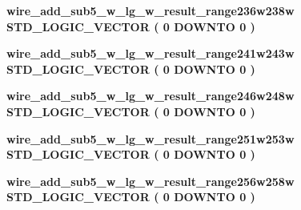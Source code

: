 \begin{DoxyCompactItemize}
\item 
{\bf wire\+\_\+add\+\_\+sub5\+\_\+w\+\_\+lg\+\_\+w\+\_\+result\+\_\+range236w238w} {\bfseries \textcolor{comment}{S\+T\+D\+\_\+\+L\+O\+G\+I\+C\+\_\+\+V\+E\+C\+T\+OR}\textcolor{vhdlchar}{ }\textcolor{vhdlchar}{(}\textcolor{vhdlchar}{ }\textcolor{vhdlchar}{ } \textcolor{vhdldigit}{0} \textcolor{vhdlchar}{ }\textcolor{keywordflow}{D\+O\+W\+N\+TO}\textcolor{vhdlchar}{ }\textcolor{vhdlchar}{ } \textcolor{vhdldigit}{0} \textcolor{vhdlchar}{ }\textcolor{vhdlchar}{)}\textcolor{vhdlchar}{ }} 
\item 
{\bf wire\+\_\+add\+\_\+sub5\+\_\+w\+\_\+lg\+\_\+w\+\_\+result\+\_\+range241w243w} {\bfseries \textcolor{comment}{S\+T\+D\+\_\+\+L\+O\+G\+I\+C\+\_\+\+V\+E\+C\+T\+OR}\textcolor{vhdlchar}{ }\textcolor{vhdlchar}{(}\textcolor{vhdlchar}{ }\textcolor{vhdlchar}{ } \textcolor{vhdldigit}{0} \textcolor{vhdlchar}{ }\textcolor{keywordflow}{D\+O\+W\+N\+TO}\textcolor{vhdlchar}{ }\textcolor{vhdlchar}{ } \textcolor{vhdldigit}{0} \textcolor{vhdlchar}{ }\textcolor{vhdlchar}{)}\textcolor{vhdlchar}{ }} 
\item 
{\bf wire\+\_\+add\+\_\+sub5\+\_\+w\+\_\+lg\+\_\+w\+\_\+result\+\_\+range246w248w} {\bfseries \textcolor{comment}{S\+T\+D\+\_\+\+L\+O\+G\+I\+C\+\_\+\+V\+E\+C\+T\+OR}\textcolor{vhdlchar}{ }\textcolor{vhdlchar}{(}\textcolor{vhdlchar}{ }\textcolor{vhdlchar}{ } \textcolor{vhdldigit}{0} \textcolor{vhdlchar}{ }\textcolor{keywordflow}{D\+O\+W\+N\+TO}\textcolor{vhdlchar}{ }\textcolor{vhdlchar}{ } \textcolor{vhdldigit}{0} \textcolor{vhdlchar}{ }\textcolor{vhdlchar}{)}\textcolor{vhdlchar}{ }} 
\item 
{\bf wire\+\_\+add\+\_\+sub5\+\_\+w\+\_\+lg\+\_\+w\+\_\+result\+\_\+range251w253w} {\bfseries \textcolor{comment}{S\+T\+D\+\_\+\+L\+O\+G\+I\+C\+\_\+\+V\+E\+C\+T\+OR}\textcolor{vhdlchar}{ }\textcolor{vhdlchar}{(}\textcolor{vhdlchar}{ }\textcolor{vhdlchar}{ } \textcolor{vhdldigit}{0} \textcolor{vhdlchar}{ }\textcolor{keywordflow}{D\+O\+W\+N\+TO}\textcolor{vhdlchar}{ }\textcolor{vhdlchar}{ } \textcolor{vhdldigit}{0} \textcolor{vhdlchar}{ }\textcolor{vhdlchar}{)}\textcolor{vhdlchar}{ }} 
\item 
{\bf wire\+\_\+add\+\_\+sub5\+\_\+w\+\_\+lg\+\_\+w\+\_\+result\+\_\+range256w258w} {\bfseries \textcolor{comment}{S\+T\+D\+\_\+\+L\+O\+G\+I\+C\+\_\+\+V\+E\+C\+T\+OR}\textcolor{vhdlchar}{ }\textcolor{vhdlchar}{(}\textcolor{vhdlchar}{ }\textcolor{vhdlchar}{ } \textcolor{vhdldigit}{0} \textcolor{vhdlchar}{ }\textcolor{keywordflow}{D\+O\+W\+N\+TO}\textcolor{vhdlchar}{ }\textcolor{vhdlchar}{ } \textcolor{vhdldigit}{0} \textcolor{vhdlchar}{ }\textcolor{vhdlchar}{)}\textcolor{vhdlchar}{ }} 

\end{DoxyCompactItemize}

